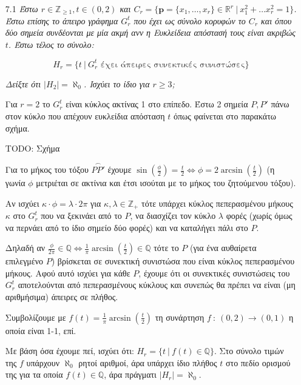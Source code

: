 \documentclass[a4paper, oneside, 11pt]{article}
\theoremstyle{definition}
\begin{document}
\begin{enumerate}
   \item[7.1] \emph{Έστω $r \in \mathbb{Z}_{\geq 1}, t \in (0, 2)$
   και $C_r = \{ \mathbf{p} = \{x_1, \ldots, x_r\} \in \mathbb{R}^r\ |\ 
   x_1^2 + \ldots x_r^2 = 1 \}$. Έστω επίσης το άπειρο γράφημα
   $G_r^t$ που έχει ως σύνολο κορυφών το $C_r$ και όπου δύο σημεία
   συνδέονται με μία ακμή ανν η Ευκλείδεια απόστασή τους είναι
   ακριβώς $t$. Έστω τέλος το σύνολο:}

   \[ H_r = \{ t\ |\ G_r^t \text{ έχει άπειρες συνεκτικές συνιστώσες} \} \]

   \emph{Δείξτε ότι $|H_2| = \aleph_0$. Ισχύει το ίδιο για $r \geq 3$;}
   \newline

   Για $r=2$ το $G_r^t$ είναι κύκλος ακτίνας 1 στο επίπεδο. Έστω
   2 σημεία $P, P'$ πάνω στον κύκλο που απέχουν ευκλείδια απόσταση $t$
   όπως φαίνεται στο παρακάτω σχήμα.

   TODO: Σχήμα

   Για το μήκος του τόξου $\stackrel\frown{PP'}$ έχουμε
   $\sin \left( \frac{\phi}{2} \right) = \frac{t}{2}
   \Leftrightarrow \phi = 2 \arcsin \left( \frac{t}{2} \right)$
   (η γωνία $\phi$ μετριέται σε ακτίνια και έτσι ισούται με το
   μήκος του ζητούμενου τόξου).

   Αν ισχύει $\kappa \cdot \phi = \lambda \cdot 2\pi$ 
   για $\kappa, \lambda \in \mathbb{Z}_+$ τότε υπάρχει
   κύκλος πεπερασμένου μήκους $\kappa$ στο $G_r^t$ που να ξεκινάει από το
   $P$, να διασχίζει τον κύκλο $\lambda$ φορές (χωρίς όμως να περνάει
   από το ίδιο σημείο δύο φορές) και να καταλήγει πάλι στο $P$.

   Δηλαδή αν $\frac{\phi}{2\pi} \in \mathbb{Q} \Leftrightarrow
   \frac{1}{\pi} \arcsin \left( \frac{t}{2} \right) \in \mathbb{Q}$
   τότε το $P$ (για ένα αυθαίρετα επιλεγμένο $P$) βρίσκεται σε συνεκτική
   συνιστώσα που είναι κύκλος πεπερασμένου μήκους. Αφού αυτό
   ισχύει για κάθε $P$, έχουμε ότι οι συνεκτικές συνιστώσεις του $G_r^t$
   αποτελούνται από πεπερασμένους κύκλους και συνεπώς θα πρέπει
   να είναι (μη αριθμήσιμα) άπειρες σε πλήθος.

   Συμβολίζουμε με $f(t) = \frac{1}{\pi} \arcsin \left( \frac{t}{2} \right)$
   τη συνάρτηση $f\ :\ (0, 2) \rightarrow (0, 1)$ η οποία είναι
   1-1, επί.
   
   Με βάση όσα έχουμε πεί, ισχύει ότι:
   $H_r = \{ t\ |\ f(t) \in \mathbb{Q} \}$. Στο σύνολο τιμών της $f$
   υπάρχουν $\aleph_0$ ρητοί αριθμοί, άρα υπάρχει ίδιο πλήθος $t$
   στο πεδίο ορισμού της για τα οποία $f(t) \in \mathbb{Q}$, άρα
   πράγματι $|H_r| = \aleph_0$.


\end{enumerate}
\end{document}
